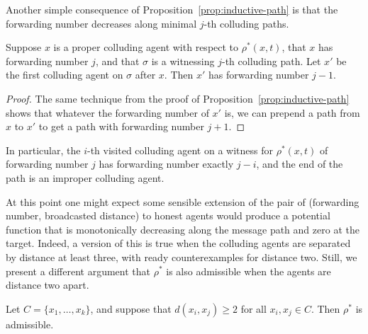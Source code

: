 \documentclass{comnet}
\begin{document}
Another simple consequence of Proposition~\ref{prop:inductive-path} is that the
forwarding number decreases along minimal $j$-th colluding paths.

\begin{proposition} \label{prop:inductive-forwarding-number}

Suppose $x$ is a proper colluding agent with respect to $\rho^*(x,t)$, that $x$
has forwarding number $j$, and that $\sigma$ is a witnessing $j$-th colluding
path. Let $x'$ be the first colluding agent on $\sigma$ after $x$. Then $x'$
has forwarding number $j-1$.  

\end{proposition}

\begin{proof}

The same technique from the proof of Proposition~\ref{prop:inductive-path}
shows that whatever the forwarding number of $x'$ is, we can prepend a path from
$x$ to $x'$ to get a path with forwarding number $j+1$.
\end{proof}

In particular, the $i$-th visited colluding agent on a witness for
$\rho^*(x,t)$ of forwarding number $j$ has forwarding number exactly $j - i$,
and the end of the path is an improper colluding agent.

At this point one might expect some sensible extension of the pair of
(forwarding number, broadcasted distance) to honest agents would produce a
potential function that is monotonically decreasing along the message path and
zero at the target. Indeed, a version of this is true when the colluding agents
are separated by distance at least three, with ready counterexamples for
distance two. Still, we present a different argument that $\rho^*$ is also
admissible when the agents are distance two apart.
 
\begin{proposition} \label{prop:rhostar-admissible}

Let $C = \{ x_1, \dots, x_k \}$, and suppose that $d(x_i, x_j) \geq 2$ for all
$x_i, x_j \in C$. Then $\rho^*$ is admissible.

\end{proposition}
\end{document}

